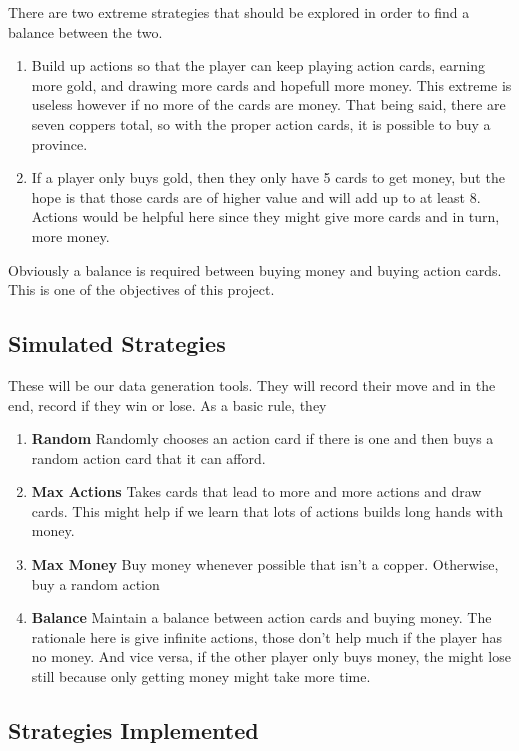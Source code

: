 \documentclass[11pt, oneside]{article}   	%
\begin{document}
There are two extreme strategies that should be explored in order to find a balance between the two.

	\begin{enumerate}
 		 \item Build up actions so that the player can keep playing action cards, earning more gold, and drawing more cards and hopefull more money. This extreme is useless however if no more of the cards are money. That being said, there are seven coppers total, so with the proper action cards, it is possible to buy a province. 
		 \item If a player only buys gold, then they only have 5 cards to get money, but the hope is that those cards are of higher value and will add up to at least 8. Actions would be helpful here since they might give more cards and in turn, more money. 
	\end{enumerate}
	
Obviously a balance is required between buying money and buying action cards. This is one of the objectives of this project. 


\subsection{Simulated Strategies}

These will be our data generation tools. They will record their move and in the end, record if they win or lose. As a basic rule, they 

	\begin{enumerate}
 		 \item \textbf{Random} Randomly chooses an action card if there is one and then buys a random action card that it can afford.
  		 \item \textbf{Max Actions} Takes cards that lead to more and more actions and draw cards. This might help if we learn that lots of actions builds long hands with money. 
		 \item \textbf{Max Money} Buy money whenever possible that isn't a copper. Otherwise, buy a random action
		 \item \textbf{Balance} Maintain a balance between action cards and buying money. The rationale here is give infinite actions, those don't help much if the player has no money. And vice versa, if the other player only buys money, the might lose still because only getting money might take more time. 
	\end{enumerate}

\subsection{Strategies Implemented}
\end{document}
